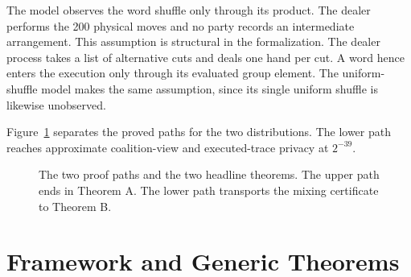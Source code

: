 \documentclass[runningheads]{llncs}
\begin{document}
The model observes the word shuffle only through its product. The dealer
performs the 200 physical moves and no party records an intermediate
arrangement. This assumption is structural in the formalization. The dealer process takes a list of alternative cuts and deals one hand
per cut. A word hence enters the execution only through its evaluated
group element. The uniform-shuffle model makes the same assumption, since its single
uniform shuffle is likewise unobserved.

Figure~\ref{fig:models} separates the proved paths for the two distributions. The
lower path reaches approximate coalition-view and executed-trace privacy at
$2^{-39}$.
\begin{figure}[t]
  \centering
  \caption{The two proof paths and the two headline theorems. The upper
  path ends in Theorem A. The lower path transports the mixing certificate
  to Theorem B.}
  \label{fig:models}
\end{figure}

\section{Framework and Generic Theorems}\label{sec:framework}
\end{document}
